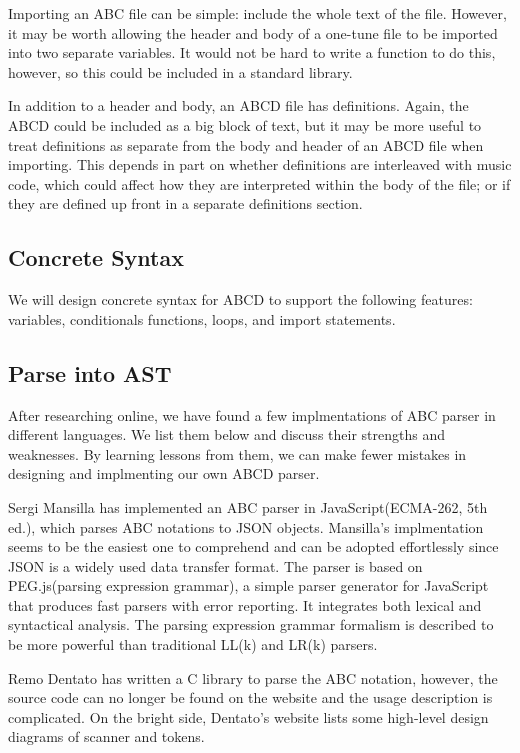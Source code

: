 	Importing an ABC file can be simple: include the whole text of the file. However, it may be worth allowing the header and body of a one-tune file to be imported into two separate variables. It would not be hard to write a function to do this, however, so this could be included in a standard library.
	
	In addition to a header and body, an ABCD file has definitions. Again, the ABCD could be included as a big block of text, but it may be more useful to treat definitions as separate from the body and header of an ABCD file when importing. This depends in part on whether definitions are interleaved with music code, which could affect how they are interpreted within the body of the file; or if they are defined up front in a separate definitions section.

\subsection{Concrete Syntax}
We will design concrete syntax for ABCD to support the following features: variables, conditionals functions, loops, and import statements.

\subsection{Parse into AST}

After researching online, we have found a few implmentations of ABC parser in different languages. We list them below and discuss their strengths and weaknesses. By learning lessons from them, we can make fewer mistakes in designing and implmenting our own ABCD parser.

Sergi Mansilla has implemented an ABC parser in JavaScript(ECMA-262, 5th ed.), which parses ABC notations to JSON objects\cite{Mansilla12}. Mansilla's implmentation seems to be the easiest one to comprehend and can be adopted effortlessly since JSON is a widely used data transfer format. The parser is based on PEG.js(parsing expression grammar), a simple parser generator for JavaScript that produces fast parsers with error reporting\cite{Ryuu17}. It integrates both lexical and syntactical analysis. The parsing expression grammar formalism is described to be more powerful than traditional LL(k) and LR(k) parsers.

Remo Dentato has written a C library to parse the ABC notation\cite{Dentato09}, however, the source code can no longer be found on the website and the usage description is complicated. On the bright side, Dentato's website lists some high-level design diagrams of scanner and tokens. 


